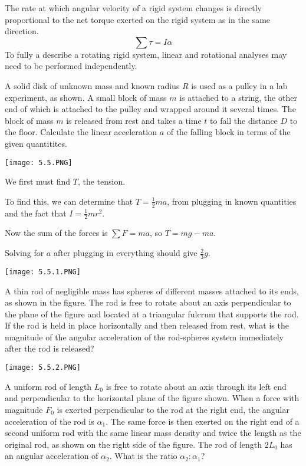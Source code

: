 \documentclass[../mech.tex]{subfiles}
\begin{document}
The rate at which angular velocity of a rigid system changes is directly proportional to the net torque exerted on the rigid system as in the same direction.
\[ \sum \tau = I\alpha \]
To fully a describe a rotating rigid system, linear and rotational analyses may need to be performed independently.
\begin{example}
    A solid disk of unknown mass and known radius $R$ is used as a pulley in a lab experiment, as shown. A small block of mass $m$ is attached to a string, the other end of which is attached to the pulley and wrapped around it several times.
    The block of mass $m$ is released from rest and takes a time $t$ to fall the distance $D$ to the floor. Calculate the linear acceleration $a$ of the falling block in terms of the given quantitites.
    \begin{center}
        \texttt{[image: 5.5.PNG]}
    \end{center}

    We first must find $T$, the tension.

    To find this, we can determine that $T=\frac{1}{2}ma$, from plugging in known quantities and the fact that $I=\frac{1}{2}mr^2$.

    Now the sum of the forces is $\sum F = ma$, so $T=mg-ma$.

    Solving for $a$ after plugging in everything should give $\frac{2}{3}g$.
\end{example}

\ex \begin{center}
    \texttt{[image: 5.5.1.PNG]}
\end{center}
A thin rod of negligible mass has spheres of different masses attached to its ends, as shown in the figure. The rod is free to rotate about an axis perpendicular to the plane of the figure and located at a triangular fulcrum that supports the rod.
If the rod is held in place horizontally and then released from rest, what is the magnitude of the angular acceleration of the rod-spheres system immediately after the rod is released?

\ex \begin{center}
    \texttt{[image: 5.5.2.PNG]}
\end{center}
A uniform rod of length $L_0$ is free to rotate about an axis through its left end and perpendicular to the horizontal plane of the figure shown. When a force with magnitude $F_0$ is exerted perpendicular to the rod at the right end, 
the angular acceleration of the rod is $\alpha_1$. The same force is then exerted on the right end of a second uniform rod with the same linear mass density and twice the length as the original rod, as shown on the right side of the figure.
The rod of length $2L_0$ has an angular acceleration of $\alpha_2$. What is the ratio $\alpha_2:\alpha_1$?
\end{document}
